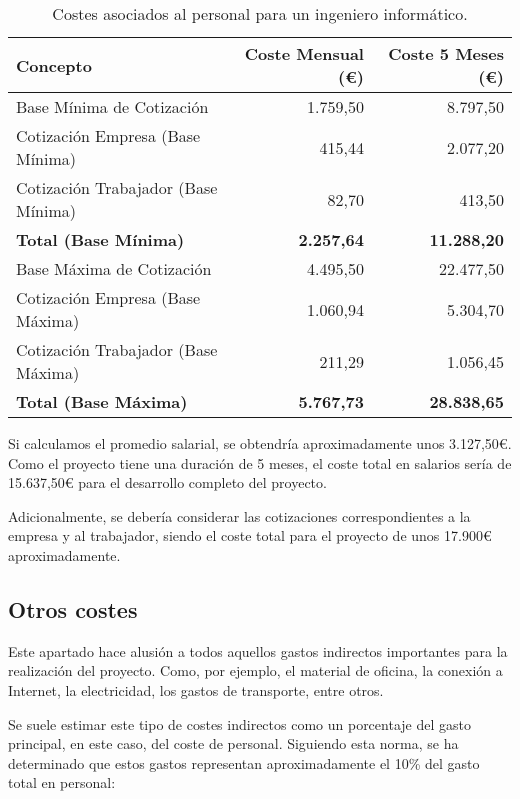 \begin{table}[H]
    \centering
    \small 
    \setlength{\tabcolsep}{1.8pt}
    \begin{tabular}{@{}lrr@{}}
        \toprule
        \textbf{Concepto} & \textbf{Coste Mensual (€)} & \textbf{Coste 5 Meses (€)} \\
        \midrule
        Base Mínima de Cotización & 1.759,50 & 8.797,50 \\
        Cotización Empresa (Base Mínima) & 415,44 & 2.077,20 \\
        Cotización Trabajador (Base Mínima) & 82,70 & 413,50 \\
        \textbf{Total (Base Mínima)} & \textbf{2.257,64} & \textbf{11.288,20} \\
        \midrule
        Base Máxima de Cotización & 4.495,50 & 22.477,50 \\
        Cotización Empresa (Base Máxima) & 1.060,94 & 5.304,70 \\
        Cotización Trabajador (Base Máxima) & 211,29 & 1.056,45 \\
        \textbf{Total (Base Máxima)} & \textbf{5.767,73} & \textbf{28.838,65} \\
        \bottomrule
    \end{tabular}

    \caption{Costes asociados al personal para un ingeniero informático.}
    \label{tab:coste-personal}

\end{table}

Si calculamos el promedio salarial, se obtendría aproximadamente unos 3.127,50€. Como el proyecto tiene una duración de 5 meses, el coste total en salarios sería de 15.637,50€ para el desarrollo completo del proyecto.

Adicionalmente, se debería considerar las cotizaciones correspondientes a la empresa y al trabajador, siendo el coste total para el proyecto de unos 17.900€ aproximadamente. 

\subsection{Otros costes}

Este apartado hace alusión a todos aquellos gastos indirectos importantes para la realización del proyecto. Como, por ejemplo, el material de oficina, la conexión a Internet, la electricidad, los gastos de transporte, entre otros.

Se suele estimar este tipo de costes indirectos como un porcentaje del gasto principal, en este caso, del coste de personal. Siguiendo esta norma, se ha determinado que estos gastos representan aproximadamente el 10\% del gasto total en personal:

